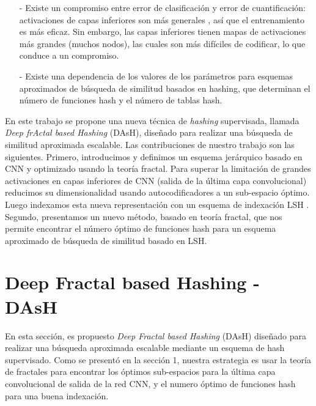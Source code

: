 \begin{itemize}

\item[-]  Existe un compromiso  entre error de clasificación y error de cuantificación: activaciones de capas inferiores son más generales \cite{DBLP:journals/corr/YosinskiCBL14}, así que el entrenamiento es más eficaz. Sin embargo, las capas inferiores tienen mapas de activaciones más grandes (muchos nodos), las cuales son más difíciles de codificar, lo que conduce a un compromiso. 
  
\item[-] Existe una dependencia de los valores de los parámetros para esquemas aproximados de búsqueda de similitud basados en hashing, que determinan el número de funciones hash y el número de tablas hash.  
 
\end{itemize}

En este trabajo  se propone una nueva técnica de \textit{hashing} supervisada,  llamada  \textit{Deep frActal based  Hashing} (DAsH),  diseñado para realizar una búsqueda de similitud aproximada escalable. Las contribuciones de nuestro trabajo son las siguientes. Primero,  introducimos y definimos un esquema jerárquico basado en CNN y optimizado usando la teoría fractal. Para superar la limitación de grandes activaciones en capas inferiores de CNN (salida de la última capa convolucional) reducimos su dimensionalidad usando autocodificadores a un sub-espacio óptimo. Luego indexamos esta nueva representación con un esquema de indexación LSH \cite{lshtutorial}.  Segundo, presentamos un nuevo método, basado en teoría fractal, que nos permite encontrar el número óptimo de funciones hash para un esquema aproximado de búsqueda de similitud basado en LSH.
  
 
\section{Deep Fractal based  Hashing - DAsH}

En esta sección, es propuesto \textit{Deep Fractal based  Hashing} (DAsH) diseñado para realizar una búsqueda aproximada escalable mediante un esquema de hash supervisado. Como se presentó en la sección 1, nuestra estrategia es usar la teoría de fractales para encontrar los óptimos sub-espacios para la última capa convolucional de salida de la red CNN, y el numero óptimo de funciones hash para una buena indexación. 

